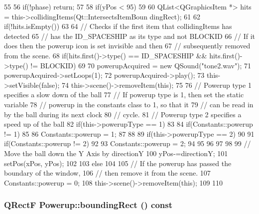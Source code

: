 \begin{DoxyCode}
55 {
56     if(!phase) return;
57 
58     if(yPos < 95)
59     {
60         QList<QGraphicsItem *> hits = this->collidingItems(Qt::IntersectsItemBoun
      dingRect);
61 
62         if(!hits.isEmpty())
63         {
64             // Checks if the first item that collidingItems has detected
65             // has the ID_SPACESHIP as its type and not BLOCKID
66             // If it does then the powerup icon is set invisible and then
67             // subsequently removed from the scene.
68             if(hits.first()->type() == ID_SPACESHIP && hits.first()->type() != 
      BLOCKID)
69             {
70                 powerupAcquired = new QSound("tone2.wav");
71                 powerupAcquired->setLoops(1);
72                 powerupAcquired->play();
73                 this->setVisible(false);
74                 this->scene()->removeItem(this);
75 
76                 // Powerup type 1 specifies a slow down of the ball
77                 // If powerup type is 1, then set the static variable
78                 // powerup in the constants class to 1, so that it
79                 // can be read in by the ball during its next clock
80                 // cycle.
81                 // Powerup type 2 specifies a speed up of the ball
82                 if(this->powerupType == 1)
83                 {
84                     if(Constants::powerup != 1)
85                     {
86                         Constants::powerup = 1;
87                     }
88                 }
89                 if(this->powerupType == 2)
90                 {
91                     if(Constants::powerup != 2)
92                     {
93                         Constants::powerup = 2;
94                     }
95                 }
96             }
97         }
98 
99         // Move the ball down the Y Axis by directionY
100         yPos-=directionY;
101         setPos(xPos, yPos);
102     }
103     else
104     {
105         // If the powerup has passed the boundary of the window,
106         // then remove it from the scene.
107         Constants::powerup = 0;
108         this->scene()->removeItem(this);
109     }
110 }
\end{DoxyCode}
\hypertarget{class_powerup_aab0164a05e29dd7acad0be68d85d8658}{
\subsubsection[{boundingRect}]{\setlength{\rightskip}{0pt plus 5cm}QRectF Powerup::boundingRect () const}}
\label{class_powerup_aab0164a05e29dd7acad0be68d85d8658}


